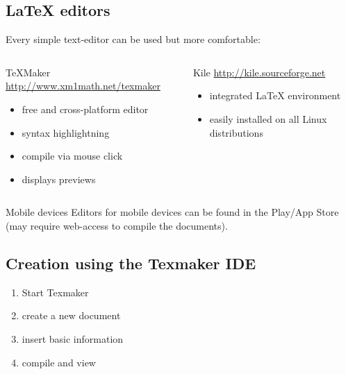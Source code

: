 \subsection{\LaTeX{} editors}
\begin{frame}

	Every simple text-editor can be used but more comfortable:

	\begin{columns}[T,onlytextwidth]
		\begin{block}{TeXMaker}
			\url{http://www.xm1math.net/texmaker}
			\begin{itemize}
				\item free and cross-platform editor
				\item syntax highlightning
				\item compile via mouse click
				\item displays previews
			\end{itemize}
		\end{block}
		\begin{block}{Kile}
			\url{http://kile.sourceforge.net}
			\begin{itemize}
				\item integrated {\LaTeX} environment
				\item easily installed on all Linux distributions
			\end{itemize}
		\end{block}
	\end{columns}

	\vfill

	\begin{block}{Mobile devices}
		Editors for mobile devices can be found in the Play/App Store
		(may require web-access to compile the documents).
	\end{block}
\end{frame}
\subsection{Creation using the Texmaker IDE}
\begin{frame}
	\begin{enumerate}
		\item Start Texmaker
		\item create a new document
		\item insert basic information
		\item compile and view
	\end{enumerate}

\end{frame}

